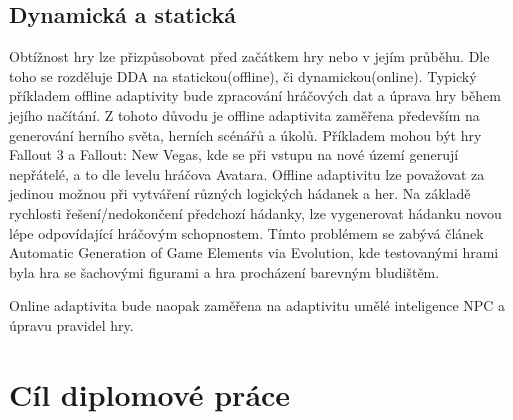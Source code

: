 \subsection{Dynamická a statická}

Obtížnost hry lze přizpůsobovat před začátkem hry nebo v jejím průběhu. Dle toho se rozděluje DDA na statickou(offline), či dynamickou(online). Typický příkladem offline adaptivity bude zpracování hráčových dat a úprava hry během jejího načítání. Z tohoto důvodu je offline adaptivita zaměřena především na generování herního světa, herních scénářů a úkolů\cite{16Survey}. Příkladem mohou být hry Fallout 3 a Fallout: New Vegas, kde se při vstupu na nové území generují nepřátelé, a to dle levelu hráčova Avatara. Offline adaptivitu lze považovat za jedinou možnou při vytváření různých logických hádanek a her. Na základě rychlosti řešení/nedokončení předchozí hádanky, lze vygenerovat hádanku novou lépe odpovídající hráčovým schopnostem. Tímto problémem se zabývá článek Automatic Generation of Game Elements via Evolution\cite{17Evol}, kde testovanými hrami byla hra se šachovými figurami a hra procházení barevným bludištěm.

Online adaptivita bude naopak zaměřena na adaptivitu umělé inteligence NPC a úpravu pravidel hry. 

\section{Cíl diplomové práce}

\endinput
